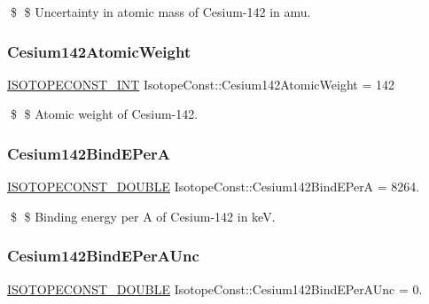 \$ \$ Uncertainty in atomic mass of Cesium-\/142 in amu. \mbox{\label{group___isotope_const-_cesium-_cs142_gaa64c6129e2adc702f5ad8429b3ea81ab}} 
\subsubsection{\texorpdfstring{Cesium142\+Atomic\+Weight}{Cesium142AtomicWeight}}
{\footnotesize\ttfamily \mbox{\hyperlink{group___isotope_const-_macros_ga5f18360b3e99483a35c32d789e62621c}{I\+S\+O\+T\+O\+P\+E\+C\+O\+N\+S\+T\+\_\+\+I\+NT}} Isotope\+Const\+::\+Cesium142\+Atomic\+Weight = 142}

\$ \$ Atomic weight of Cesium-\/142. \mbox{\label{group___isotope_const-_cesium-_cs142_ga01becb4122c66bac16a83f84de6bc8e5}} 
\subsubsection{\texorpdfstring{Cesium142\+Bind\+E\+PerA}{Cesium142BindEPerA}}
{\footnotesize\ttfamily \mbox{\hyperlink{group___isotope_const-_macros_ga8f45a7272ce02c0b4c65c44636ed719a}{I\+S\+O\+T\+O\+P\+E\+C\+O\+N\+S\+T\+\_\+\+D\+O\+U\+B\+LE}} Isotope\+Const\+::\+Cesium142\+Bind\+E\+PerA = 8264.}

\$ \$ Binding energy per A of Cesium-\/142 in keV. \mbox{\label{group___isotope_const-_cesium-_cs142_ga39d360880a2442df949deb62abb577f1}} 
\subsubsection{\texorpdfstring{Cesium142\+Bind\+E\+Per\+A\+Unc}{Cesium142BindEPerAUnc}}
{\footnotesize\ttfamily \mbox{\hyperlink{group___isotope_const-_macros_ga8f45a7272ce02c0b4c65c44636ed719a}{I\+S\+O\+T\+O\+P\+E\+C\+O\+N\+S\+T\+\_\+\+D\+O\+U\+B\+LE}} Isotope\+Const\+::\+Cesium142\+Bind\+E\+Per\+A\+Unc = 0.}

